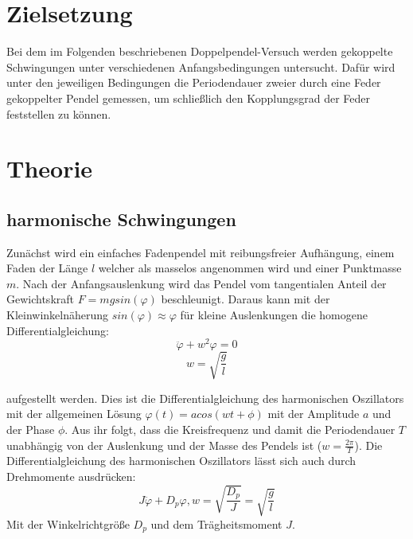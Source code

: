 
\section{Zielsetzung}
\label{sec:Theorie}
Bei dem im Folgenden beschriebenen Doppelpendel-Versuch werden gekoppelte Schwingungen unter verschiedenen Anfangsbedingungen untersucht. Dafür wird unter den jeweiligen Bedingungen die Periodendauer zweier durch eine Feder gekoppelter Pendel gemessen, um schließlich den Kopplungsgrad der Feder feststellen zu können.
\section{Theorie}
\subsection{harmonische Schwingungen}
Zunächst wird ein einfaches Fadenpendel mit reibungsfreier Aufhängung, einem Faden der Länge $l$ 
welcher als masselos angenommen wird und einer Punktmasse $m$. Nach der Anfangsauslenkung wird das 
Pendel vom tangentialen Anteil der Gewichtskraft $F=mgsin(\varphi)$ beschleunigt.
Daraus kann mit der Kleinwinkelnäherung $sin(\varphi)\approx\varphi$ für kleine Auslenkungen die 
homogene Differentialgleichung:
\begin{equation}
\ddot{\varphi}+w^2\varphi=0

\end{equation}
\begin{equation}
w=\sqrt{\frac{g}{l}}
\end{equation}

aufgestellt werden.\newline
Dies ist die Differentialgleichung des harmonischen Oszillators mit der allgemeinen Lösung 
$\varphi(t)=acos(wt+\phi)$ mit der Amplitude $a$ und der Phase $\phi$. Aus ihr folgt, dass 
die  Kreisfrequenz und damit die Periodendauer $T$ unabhängig von der Auslenkung und der Masse 
des Pendels ist ($w=\frac{2\pi}{T}$). Die Differentialgleichung des harmonischen Oszillators lässt 
sich auch durch Drehmomente ausdrücken: 
\begin{equation}
J\ddot{\varphi}+D_p\varphi, w=\sqrt{\frac{D_p}{J}}=\sqrt{\frac{g}{l}}
\end{equation}
Mit der Winkelrichtgröße $D_p$ und dem Trägheitsmoment $J$.
